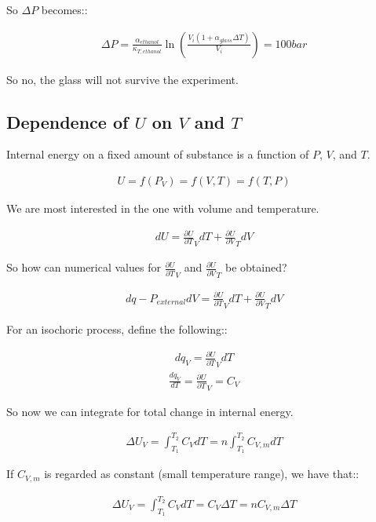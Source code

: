 \documentclass[12pt]{article}
\begin{document}
So $\Delta P$ becomes::

\begin{align*}
    \Delta P=\frac{\alpha_{ethanol}}{\kappa_{T,ethanol}}\ln(\frac{V_i(1+\alpha_{glass}\Delta T)}{V_i})=100bar
\end{align*}

So no, the glass will not survive the experiment.

\subsection*{Dependence of $U$ on $V$ and $T$}

Internal energy on a fixed amount of substance is a function of $P$, $V$, and $T$.

\begin{align*}
    U=f(P_V)=f(V,T)=f(T,P)
\end{align*}

We are most interested in the one with volume and temperature.

\begin{align*}
    dU=\frac{\partial U}{\partial T}_V dT+\frac{\partial U}{\partial V}_T dV
\end{align*}

So how can numerical values for $\frac{\partial U}{\partial T}_V$ and $\frac{\partial U}{\partial V}_T$ be obtained?

\begin{align*}
    dq-P_{external}dV=\frac{\partial U}{\partial T}_V dT+\frac{\partial U}{\partial V}_T dV
\end{align*}

For an isochoric process, define the following::

\begin{align*}
    dq_V=\frac{\partial U}{\partial T}_V dT
\end{align*}
\begin{align*}
    \frac{dq_V}{dT}=\frac{\partial U}{\partial T}_V=C_V
\end{align*}

So now we can integrate for total change in internal energy.

\begin{align*}
    \Delta U_V=\int_{T_1}^{T_2}C_V dT=n\int_{T_1}^{T_2}C_{V,m}dT
\end{align*}

If $C_{V,m}$ is regarded as constant (small temperature range), we have that::

\begin{align*}
    \Delta U_V=\int_{T_1}^{T_2}C_V dT=C_V\Delta T=nC_{V,m}\Delta T
\end{align*}
\end{document}
